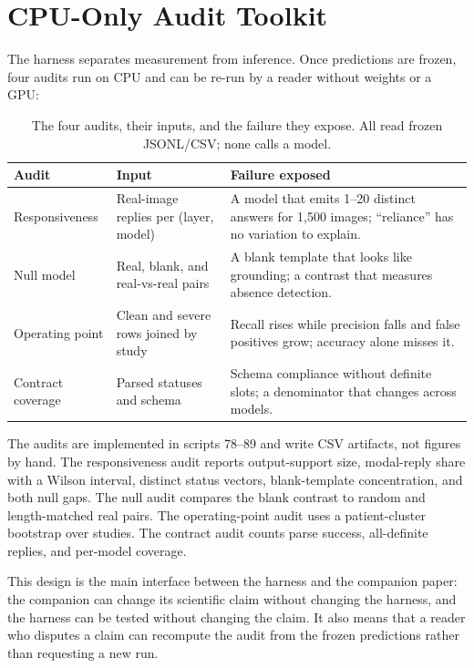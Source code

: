 \section{CPU-Only Audit Toolkit}
\label{sec:audit}

The harness separates measurement from inference. Once predictions are frozen, four audits run on CPU and can be re-run by a reader without weights or a GPU:

\begin{table}[t]
\centering
\small
\caption{The four audits, their inputs, and the failure they expose. All read frozen JSONL/CSV; none calls a model.}
\label{tab:audits}
\begin{tabular}{p{}p{}p{}}
\toprule
Audit & Input & Failure exposed \\
\midrule
Responsiveness & Real-image replies per (layer, model) & A model that emits 1--20 distinct answers for 1,500 images; ``reliance'' has no variation to explain. \\
Null model & Real, blank, and real-vs-real pairs & A blank template that looks like grounding; a contrast that measures absence detection. \\
Operating point & Clean and severe rows joined by study & Recall rises while precision falls and false positives grow; accuracy alone misses it. \\
Contract coverage & Parsed statuses and schema & Schema compliance without definite slots; a denominator that changes across models. \\
\bottomrule
\end{tabular}
\end{table}

The audits are implemented in scripts 78--89 and write CSV artifacts, not figures by hand. The responsiveness audit reports output-support size, modal-reply share with a Wilson interval, distinct status vectors, blank-template concentration, and both null gaps. The null audit compares the blank contrast to random and length-matched real pairs. The operating-point audit uses a patient-cluster bootstrap over studies. The contract audit counts parse success, all-definite replies, and per-model coverage.

This design is the main interface between the harness and the companion paper: the companion can change its scientific claim without changing the harness, and the harness can be tested without changing the claim. It also means that a reader who disputes a claim can recompute the audit from the frozen predictions rather than requesting a new run.
